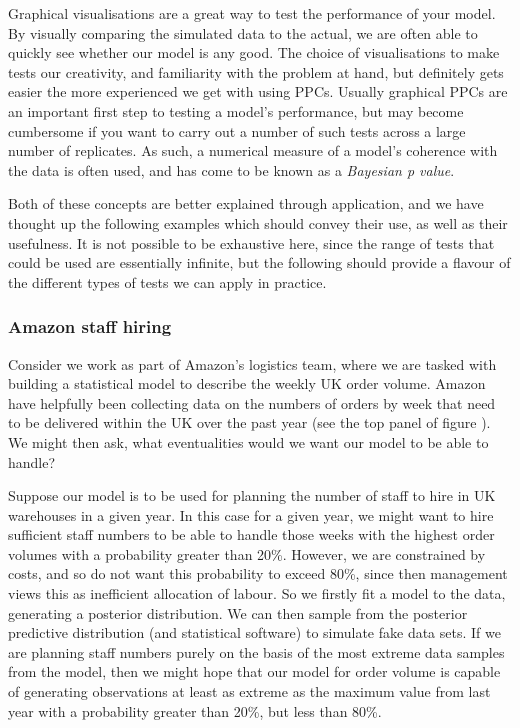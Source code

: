 \documentclass[11pt,fullpage]{book}
\begin{document}
Graphical visualisations are a great way to test the performance of your model. By visually comparing the simulated data to the actual, we are often able to quickly see whether our model is any good. The choice of visualisations to make tests our creativity, and familiarity with the problem at hand, but definitely gets easier the more experienced we get with using PPCs. Usually graphical PPCs are an important first step to testing a model's performance, but may become cumbersome if you want to carry out a number of such tests across a large number of replicates. As such, a numerical measure of a model's coherence with the data is often used, and has come to be known as a \textit{Bayesian p value}.

Both of these concepts are better explained through application, and we have thought up the following examples which should convey their use, as well as their usefulness. It is not possible to be exhaustive here, since the range of tests that could be used are essentially infinite, but the following should provide a flavour of the different types of tests we can apply in practice.

\subsubsection{Amazon staff hiring}

Consider we work as part of Amazon's logistics team, where we are tasked with building a statistical model to describe the weekly UK order volume. Amazon have helpfully been collecting data on the numbers of orders by week that need to be delivered within the UK over the past year (see the top panel of figure ). We might then ask, what eventualities would we want our model to be able to handle? 

Suppose our model is to be used for planning the number of staff to hire in UK warehouses in a given year. In this case for a given year, we might want to hire sufficient staff numbers to be able to handle those weeks with the highest order volumes with a probability greater than 20\%. However, we are constrained by costs, and so do not want this probability to exceed 80\%, since then management views this as inefficient allocation of labour. So we firstly fit a model to the data, generating a posterior distribution. We can then sample from the posterior predictive distribution (and statistical software) to simulate fake data sets. If we are planning staff numbers purely on the basis of the most extreme data samples from the model, then we might hope that our model for order volume is capable of generating observations at least as extreme as the maximum value from last year with a probability greater than 20\%, but less than 80\%.
\end{document}
